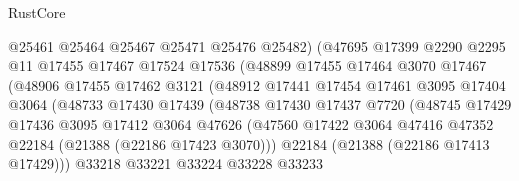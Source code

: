 \begin{lexlean}{RustCore}
\begin{coremodule}
                              @25461
                              @25464
                              @25467
                              @25471
                              @25476
                              @25482)
                            (@47695
                              @17399
                              @2290
                              @2295
                              @11
                              @17455
                              @17467
                              @17524
                              @17536
                              (@48899
                                @17455
                                @17464
                                @3070
                                @17467
                                (@48906
                                  @17455
                                  @17462
                                  @3121
                                  (@48912
                                    @17441
                                    @17454
                                    @17461
                                    @3095
                                    @17404
                                    @3064
                                    (@48733
                                      @17430
                                      @17439
                                      (@48738
                                        @17430
                                        @17437
                                        @7720
                                        (@48745
                                          @17429
                                          @17436
                                          @3095
                                          @17412
                                          @3064
                                          @47626
                                          (@47560
                                            @17422
                                            @3064
                                            @47416
                                            @47352
                                            @22184
                                            (@21388 (@22186 @17423 @3070)))
                                          @22184
                                          (@21388 (@22186 @17413 @17429)))
                                        @33218
                                        @33221
                                        @33224
                                        @33228
                                        @33233

\end{coremodule}
\end{lexlean}
